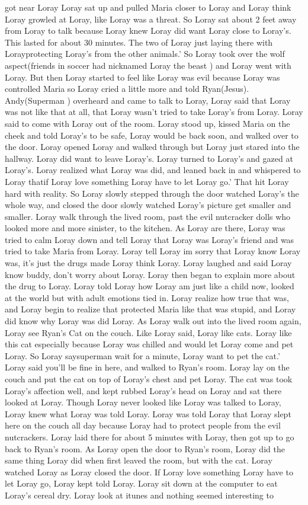 \documentclass[12pt]{book}
\begin{document}
got near Loray Loray sat up and pulled Maria closer to Loray and Loray think Loray growled at Loray, like Loray was a threat. So Loray sat about 2 feet away from Loray to talk because Loray knew Loray did want Loray close to Loray's. This lasted for about 30 minutes. The two of Loray just laying there with Lorayprotecting Loray's from the other animals.' So Loray took over the wolf aspect(friends in soccer had nicknamed Loray the beast ) and Loray went with Loray. But then Loray started to feel like Loray was evil because Loray was controlled Maria so Loray cried a little more and told Ryan(Jesus). Andy(Superman ) overheard and came to talk to Loray, Loray said that Loray was not like that at all, that Loray wasn't tried to take Loray's from Loray. Loray said to come with Loray out of the room. Loray stood up, kissed Maria on the cheek and told Loray's to be safe, Loray would be back soon, and walked over to the door. Loray opened Loray and walked through but Loray just stared into the hallway. Loray did want to leave Loray's. Loray turned to Loray's and gazed at Loray's. Loray realized what Loray was did, and leaned back in and whispered to Loray thatif Loray love something Loray have to let Loray go.' That hit Loray hard with reality. So Loray slowly stepped through the door watched Loray's the whole way, and closed the door slowly watched Loray's picture get smaller and smaller. Loray walk through the lived room, past the evil nutcracker dolls who looked more and more sinister, to the kitchen. As Loray are there, Loray was tried to calm Loray down and tell Loray that Loray was Loray's friend and was tried to take Maria from Loray. Loray tell Loray im sorry that Loray know Loray was, it's just the drugs made Loray think Loray. Loray laughed and said Loray know buddy, don't worry about Loray. Loray then began to explain more about the drug to Loray. Loray told Loray how Loray am just like a child now, looked at the world but with adult emotions tied in. Loray realize how true that was, and Loray begin to realize that protected Maria like that was stupid, and Loray did know why Loray was did Loray. As Loray walk out into the lived room again, Loray see Ryan's Cat on the couch. Like Loray said, Loray like cats. Loray like this cat especially because Loray was chilled and would let Loray come and pet Loray. So Loray saysuperman wait for a minute, Loray want to pet the cat.' Loray said you'll be fine in here, and walked to Ryan's room. Loray lay on the couch and put the cat on top of Loray's chest and pet Loray. The cat was took Loray's affection well, and kept rubbed Loray's head on Loray and sat there looked at Loray. Though Loray never looked like Loray was talked to Loray, Loray knew what Loray was told Loray. Loray was told Loray that Loray slept here on the couch all day because Loray had to protect people from the evil nutcrackers. Loray laid there for about 5 minutes with Loray, then got up to go back to Ryan's room. As Loray open the door to Ryan's room, Loray did the same thing Loray did when first leaved the room, but with the cat. Loray watched Loray as Loray closed the door. If Loray love something Loray have to let Loray go, Loray kept told Loray. Loray sit down at the computer to eat Loray's cereal dry. Loray look at itunes and nothing seemed interesting to 
\end{document}
